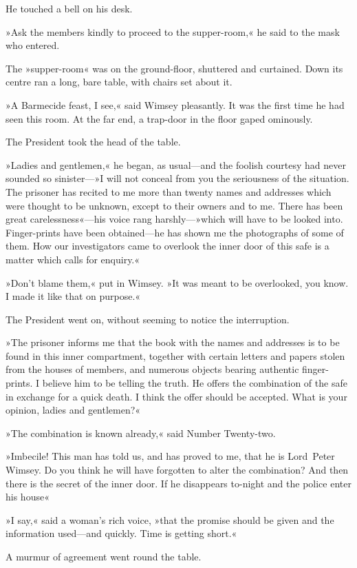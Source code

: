 He touched a bell on his desk.

»Ask the members kindly to proceed to the supper-room,« he said to the mask who entered.

The »supper-room« was on the ground-floor, shuttered and curtained. Down its centre ran a long, bare table, with chairs set about it.

»A Barmecide feast, I see,« said Wimsey pleasantly. It was the first time he had seen this room. At the far end, a trap-door in the floor gaped ominously.

The President took the head of the table.

»Ladies and gentlemen,« he began, as usual—and the foolish courtesy had never sounded so sinister—»I will not conceal from you the seriousness of the situation. The prisoner has recited to me more than twenty names and addresses which were thought to be unknown, except to their owners and to me. There has been great carelessness«—his voice rang harshly—»which will have to be looked into. Finger-prints have been obtained—he has shown me the photographs of some of them. How our investigators came to overlook the inner door of this safe is a matter which calls for enquiry.«

»Don't blame them,« put in Wimsey. »It was meant to be overlooked, you know. I made it like that on purpose.«

The President went on, without seeming to notice the interruption.

»The prisoner informs me that the book with the names and addresses is to be found in this inner compartment, together with certain letters and papers stolen from the houses of members, and numerous objects bearing authentic finger-prints. I believe him to be telling the truth. He offers the combination of the safe in exchange for a quick death. I think the offer should be accepted. What is your opinion, ladies and gentlemen?«

»The combination is known already,« said Number Twenty-two.

»Imbecile! This man has told us, and has proved to me, that he is Lord~Peter Wimsey. Do you think he will have forgotten to alter the combination? And then there is the secret of the inner door. If he disappears to-night and the police enter his house\longdash«

»I say,« said a woman's rich voice, »that the promise should be given and the information used—and quickly. Time is getting short.«

A murmur of agreement went round the table.

